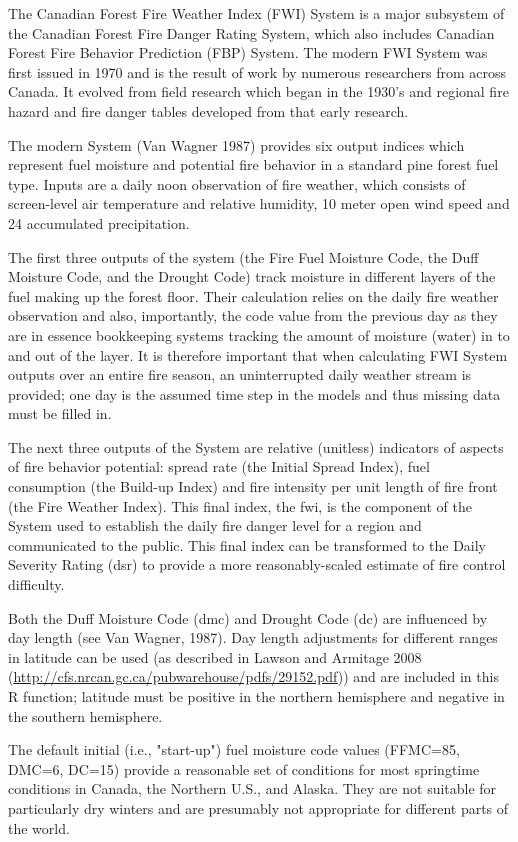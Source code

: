 \documentclass[a4paper]{book}
\begin{document}
%
\begin{Details}\relax
The Canadian Forest Fire Weather Index (FWI) System is a major subsystem of
the Canadian Forest Fire Danger Rating System, which also includes Canadian
Forest Fire Behavior Prediction (FBP) System. The modern FWI System was
first issued in 1970 and is the result of work by numerous researchers from
across Canada. It evolved from field research which began in the 1930's and
regional fire hazard and fire danger tables developed from that early
research.

The modern System (Van Wagner 1987) provides six output indices which
represent fuel moisture and potential fire behavior in a standard pine
forest fuel type. Inputs are a daily noon observation of fire weather, which
consists of screen-level air temperature and relative humidity, 10 meter
open wind speed and 24 accumulated precipitation.

The first three outputs of the system (the Fire Fuel Moisture Code, the Duff
Moisture Code, and the Drought Code) track moisture in different layers of
the fuel making up the forest floor. Their calculation relies on the daily
fire weather observation and also, importantly, the code value from the
previous day as they are in essence bookkeeping systems tracking the amount
of moisture (water) in to and out of the layer.  It is therefore important
that when calculating FWI System outputs over an entire fire season, an
uninterrupted daily weather stream is provided; one day is the assumed time
step in the models and thus missing data must be filled in.

The next three outputs of the System are relative (unitless) indicators of
aspects of fire behavior potential: spread rate (the Initial Spread Index),
fuel consumption (the Build-up Index) and fire intensity per unit length of
fire front (the Fire Weather Index).  This final index, the fwi, is the
component of the System used to establish the daily fire danger level for a
region and communicated to the public.  This final index can be transformed
to the Daily Severity Rating (dsr) to provide a more reasonably-scaled
estimate of fire control difficulty.

Both the Duff Moisture Code (dmc) and Drought Code (dc) are influenced by
day length (see Van Wagner, 1987). Day length adjustments for different
ranges in latitude can be used (as described in Lawson and Armitage 2008
(\url{http://cfs.nrcan.gc.ca/pubwarehouse/pdfs/29152.pdf})) and are included
in this R function; latitude must be positive in the northern hemisphere and
negative in the southern hemisphere.

The default initial (i.e., "start-up") fuel moisture code values (FFMC=85,
DMC=6, DC=15) provide a reasonable set of conditions for most springtime
conditions in Canada, the Northern U.S., and Alaska. They are not suitable
for particularly dry winters and are presumably not appropriate for
different parts of the world.
\end{Details}
\end{document}
